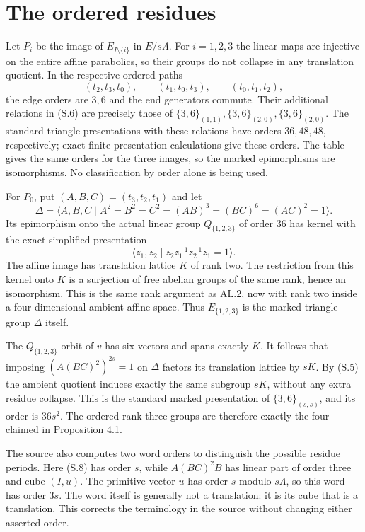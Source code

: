 \section{The ordered residues}
Let $P_i$ be the image of $E_{I\setminus\{i\}}$ in $E/s\Lambda$.
For $i=1,2,3$ the linear maps are injective on the entire affine
parabolics, so their groups do not collapse in any translation quotient.
In the respective ordered paths
\[
 (t_2,t_3,t_0),\qquad(t_1,t_0,t_3),\qquad(t_0,t_1,t_2),
\]
the edge orders are $3,6$ and the end generators commute. Their
additional relations in (S.6) are precisely those of
$\{3,6\}_{(1,1)},\{3,6\}_{(2,0)},\{3,6\}_{(2,0)}$.
The standard triangle presentations with these relations have orders
$36,48,48$, respectively; exact finite presentation calculations give
these orders. The table gives the same orders for the three images,
so the marked epimorphisms are isomorphisms. No classification by order
alone is being used.

For $P_0$, put $(A,B,C)=(t_3,t_2,t_1)$ and let
\[
 \Delta=\langle A,B,C\mid A^2=B^2=C^2=(AB)^3=(BC)^6=(AC)^2=1\rangle.
\]
Its epimorphism onto the actual linear group $Q_{\{1,2,3\}}$ of
order $36$ has kernel with the exact simplified presentation
\[
 \langle z_1,z_2\mid z_2z_1^{-1}z_2^{-1}z_1=1\rangle.
\]
The affine image has translation lattice $K$ of rank two. The
restriction from this kernel onto $K$ is a surjection of free abelian
groups of the same rank, hence an isomorphism. This is the same
rank argument as AL.2, now with rank two inside a four-dimensional
ambient affine space. Thus $E_{\{1,2,3\}}$ is the marked triangle group
$\Delta$ itself.

The $Q_{\{1,2,3\}}$-orbit of $v$ has six vectors and spans exactly $K$.
It follows that imposing $(A(BC)^2)^{2s}=1$ on $\Delta$ factors its
translation lattice by $sK$. By (S.5) the ambient quotient induces
exactly the same subgroup $sK$, without any extra residue collapse.
This is the standard marked presentation of $\{3,6\}_{(s,s)}$, and
its order is $36s^2$. The ordered rank-three groups are therefore
exactly the four claimed in Proposition 4.1.

The source also computes two word orders to distinguish the possible
residue periods. Here (S.8) has order $s$, while
$A(BC)^2B$ has linear part of order three and cube $(I,u)$.
The primitive vector $u$ has order $s$ modulo $s\Lambda$, so this
word has order $3s$. The word itself is generally not a translation:
it is its cube that is a translation. This corrects the terminology
in the source without changing either asserted order.

